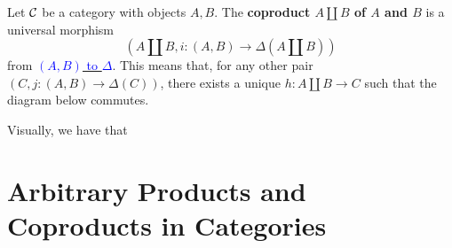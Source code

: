 \begin{definition}
    Let $\mathcal{C}$ be a category with objects $A, B$. The 
    \textbf{coproduct $A \amalg B$ of $A$ and $B$} is 
    a universal morphism 
    \[
        (A \amalg B, i: (A,B) \to \Delta(A \amalg B))
    \]
    from \hyperref[definition:universal_morphism_from_F_to_D]{\textcolor{blue}{$(A,B)$ to $\Delta$}}. 
    This means that, for any other pair $(C, j: (A, B) \to \Delta(C))$, there exists 
    a unique $h: A \amalg B \to C$ such that the diagram below commutes. 
    \begin{center}
        \hspace{1cm}
    \end{center}

    Visually, we have that 
    \begin{center}
    \hspace{1cm}
    \end{center}
\end{definition}

    \newpage
    \section{Arbitrary Products and Coproducts in Categories}

